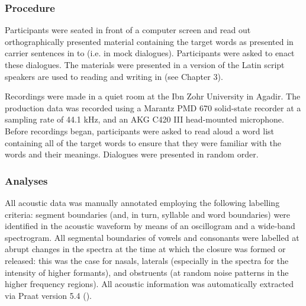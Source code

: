 \subsubsection{Procedure}
Participants were seated in front of a computer screen and read out orthographically presented material containing the target words as presented in carrier sentences in  to  (i.e. in mock dialogues). Participants were asked to enact these dialogues. The materials were presented in a version of the Latin script speakers are used to reading and writing in (see Chapter 3).

Recordings were made in a quiet room at the Ibn Zohr University in Agadir. The production data was recorded using a Marantz PMD 670 solid-state recorder at a sampling rate of 44.1 kHz, and an AKG C420 III head-mounted microphone. Before recordings began, participants were asked to read aloud a word list containing all of the target words to ensure that they were familiar with the words and their meanings. Dialogues were presented in random order. 

\subsubsection{Analyses}
All acoustic data was manually annotated employing the following labelling criteria: segment boundaries (and, in turn, syllable and word boundaries) were identified in the acoustic waveform by means of an oscillogram and a wide-band spectrogram. All segmental boundaries of vowels and consonants were labelled at abrupt changes in the spectra at the time at which the closure was formed or released: this was the case for nasals, laterals (especially in the spectra for the intensity of higher formants), and obstruents (at random noise patterns in the higher frequency regions). All acoustic information was automatically extracted via Praat version 5.4 (\citealt{Praat2015}). 

